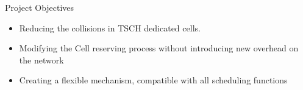 



\begin{withoutheadline}
\begin{frame}{Project Objectives}
\begin{itemize}
\item {Reducing the collisions in TSCH dedicated cells.}
  \item<2-> {Modifying the Cell reserving process without introducing new overhead on the network}
  \item<3-> {Creating a flexible mechanism, compatible with all scheduling functions }

\end{itemize}

\end{frame}
\end{withoutheadline}
